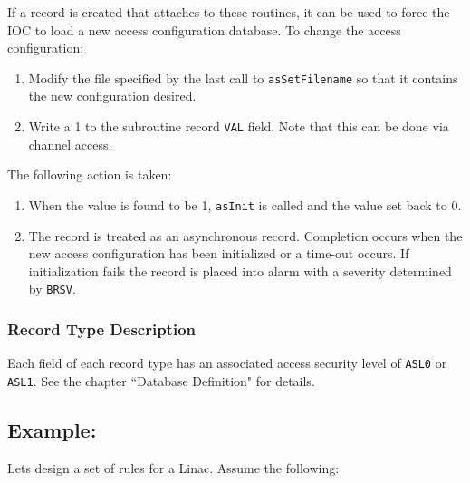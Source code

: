 If a record is created that attaches to these routines, it can be used to force the IOC to load a new access configuration 
database. To change the access configuration:

\begin{enumerate}\item Modify the file specified by the last call to \verb|asSetFilename| so that it contains the new configuration desired.

\item Write a 1 to the subroutine record \verb|VAL| field. Note that this can be done via channel access.

\end{enumerate}The following action is taken:

\begin{enumerate}\item When the value is found to be 1, \verb|asInit| is called and the value set back to 0.

\item The record is treated as an asynchronous record. Completion occurs when the new access configuration has been 
initialized or a time-out occurs. If initialization fails the record is placed into alarm with a severity determined by 
\verb|BRSV|.

\end{enumerate}\subsubsection{Record Type Description}

Each field of each record type has an associated access security level of \verb|ASL0| or \verb|ASL1|. See the chapter ``Database 
Definition" for details.

\subsection{Example:}

Lets design a set of rules for a Linac. Assume the following:

